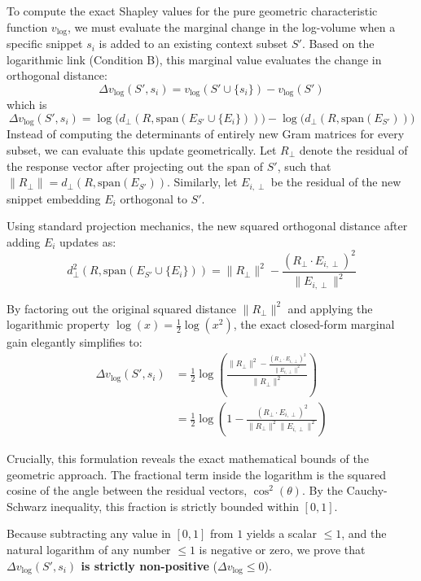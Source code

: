 \documentclass{article}
\begin{document}
To compute the exact Shapley values for the pure geometric characteristic function $v_{\log}$, we must evaluate the marginal change in the log-volume when a specific snippet $s_i$ is added to an existing context subset $S'$. Based on the logarithmic link (Condition B), this marginal value evaluates the change in orthogonal distance:
$$ \Delta v_{\log}(S', s_i) = v_{\log}(S' \cup \{s_i\}) - v_{\log}(S') $$
which is
$$ \Delta v_{\log}(S', s_i) = \log\big(d_{\perp}(R, \text{span}(E_{S'} \cup \{E_i\}))\big) - \log\big(d_{\perp}(R, \text{span}(E_{S'}))\big) $$
Instead of computing the determinants of entirely new Gram matrices for every subset, we can evaluate this update geometrically. Let $R_{\perp}$ denote the residual of the response vector after projecting out the span of $S'$, such that $\|R_{\perp}\| = d_{\perp}(R, \text{span}(E_{S'}))$. Similarly, let $E_{i, \perp}$ be the residual of the new snippet embedding $E_i$ orthogonal to $S'$. 

Using standard projection mechanics, the new squared orthogonal distance after adding $E_i$ updates as:
$$ d_{\perp}^2(R, \text{span}(E_{S'} \cup \{E_i\})) = \|R_{\perp}\|^2 - \frac{(R_{\perp} \cdot E_{i, \perp})^2}{\|E_{i, \perp}\|^2} $$

By factoring out the original squared distance $\|R_{\perp}\|^2$ and applying the logarithmic property $\log(x) = \frac{1}{2} \log(x^2)$, the exact closed-form marginal gain elegantly simplifies to:
\begin{align} \label{eq:marginal_vlog}
\Delta v_{\log}(S', s_i) &= \frac{1}{2} \log \left( \frac{\|R_{\perp}\|^2 - \frac{(R_{\perp} \cdot E_{i, \perp})^2}{\|E_{i, \perp}\|^2}}{\|R_{\perp}\|^2} \right) \nonumber \\
&= \frac{1}{2} \log \left( 1 - \frac{(R_{\perp} \cdot E_{i, \perp})^2}{\|R_{\perp}\|^2 \|E_{i, \perp}\|^2} \right)
\end{align}

Crucially, this formulation reveals the exact mathematical bounds of the geometric approach. The fractional term inside the logarithm is the squared cosine of the angle between the residual vectors, $\cos^2(\theta)$. By the Cauchy-Schwarz inequality, this fraction is strictly bounded within $[0, 1]$. 

Because subtracting any value in $[0, 1]$ from $1$ yields a scalar $\le 1$, and the natural logarithm of any number $\le 1$ is negative or zero, we prove that \textbf{$\Delta v_{\log}(S', s_i)$ is strictly non-positive} ($\Delta v_{\log} \le 0$). 
\end{document}
